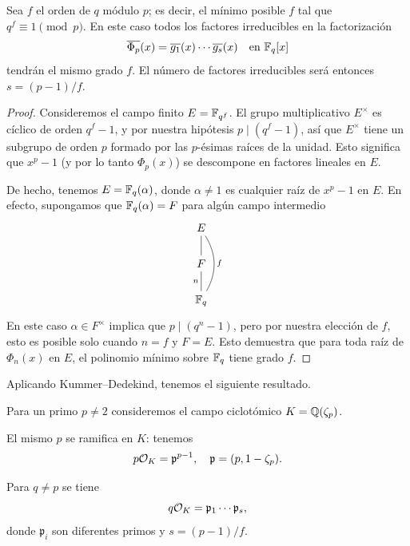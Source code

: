 \begin{lema}
  Sea $f$ el orden de $q$ módulo $p$; es decir, el mínimo posible $f$
  tal que $q^f \equiv 1 \pmod{p}$. En este caso todos los factores irreducibles
  en la factorización
  \[ \overline{\Phi_p} (x) = \overline{g_1} (x) \cdots \overline{g_s} (x)
     \quad\text{en }\mathbb{F}_q [x] \]
  tendrán el mismo grado $f$. El número de factores irreducibles será entonces
  $s = (p-1)/f$.

  \begin{proof}
    Consideremos el campo finito $E = \mathbb{F}_{q^f}$. El grupo multiplicativo
    $E^\times$ es cíclico de orden $q^f - 1$, y por nuestra hipótesis
    $p \mid (q^f - 1)$, así que $E^\times$ tiene un subgrupo de orden $p$
    formado por las $p$-ésimas raíces de la unidad. Esto significa que $x^p - 1$
    (y por lo tanto $\Phi_p (x)$) se descompone en factores lineales en $E$.

    De hecho, tenemos $E = \mathbb{F}_q (\alpha)$, donde $\alpha \ne 1$ es cualquier
    raíz de $x^p - 1$ en $E$. En efecto, supongamos que $\mathbb{F}_q (\alpha) = F$
    para algún campo intermedio
    \[ \begin{tikzcd}
      E \ar[-]{d} \ar[-,bend left=30]{dd}{f} \\
      F \ar[-]{d}[swap]{n} \\
      \FF_q
    \end{tikzcd} \]
    En este caso $\alpha \in F^\times$ implica que $p \mid (q^n - 1)$, pero por
    nuestra elección de $f$, esto es posible solo cuando $n = f$ y $F = E$. Esto
    demuestra que para toda raíz de $\Phi_n (x)$ en $E$, el polinomio mínimo
    sobre $\mathbb{F}_q$ tiene grado $f$.
  \end{proof}
\end{lema}

Aplicando Kummer--Dedekind, tenemos el siguiente resultado.

\begin{proposicion}
  Para un primo $p \ne 2$ consideremos el campo ciclotómico $K = \mathbb{Q} (\zeta_p)$.

  El mismo $p$ se ramifica en $K$: tenemos
  $$p \mathcal{O}_K = \mathfrak{p}^{p-1}, \quad \mathfrak{p} = (p, 1 - \zeta_p).$$

  Para $q \ne p$ se tiene
  $$q \mathcal{O}_K = \mathfrak{p}_1\cdots \mathfrak{p}_s,$$
  donde $\mathfrak{p}_i$ son diferentes primos y $s = (p-1)/f$.
\end{proposicion}

